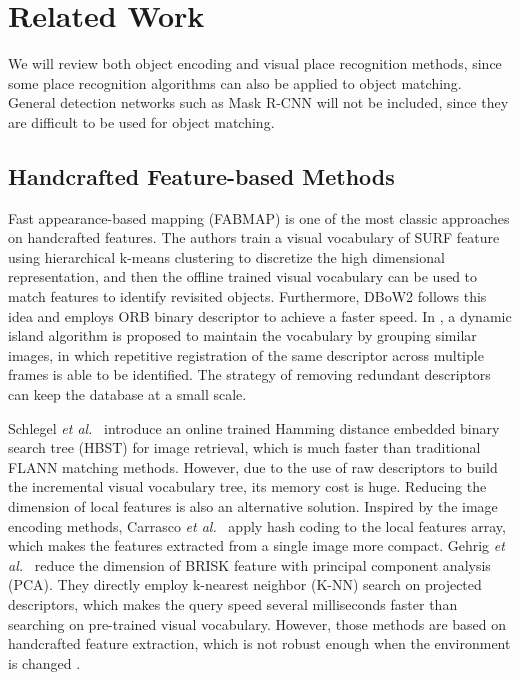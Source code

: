 \documentclass[letterpaper, 10 pt, journal, twoside]{IEEEtran}  %
\newcommand{\etal}{\textit{et al.}~}
\begin{document}
\section{Related Work}

We will review both object encoding and visual place recognition methods, since some place recognition algorithms can also be applied to object matching.
General detection networks such as Mask R-CNN \cite{he2017mask} will not be included, since they are difficult to be used for object matching.

\subsection{Handcrafted Feature-based Methods}

Fast appearance-based mapping (FABMAP) \cite{glover2012openfabmap} is one of the most classic approaches on handcrafted features. The authors train a visual vocabulary of SURF feature \cite{bay2006surf} using hierarchical k-means clustering to discretize the high dimensional representation, and then the offline trained visual vocabulary can be used to match features to identify revisited objects. Furthermore, DBoW2 \cite{galvez2012bags} follows this idea and employs ORB binary descriptor \cite{rublee2011orb} to achieve a faster speed.  In \cite{garcia2018ibow}, a dynamic island algorithm is proposed to maintain the vocabulary by grouping similar images, in which repetitive registration of the same descriptor across multiple frames is able to be identified. The strategy of removing redundant descriptors can keep the database at a small scale.

Schlegel \etal \cite{schlegel2018hbst} introduce an online trained Hamming distance embedded binary search tree (HBST) for image retrieval, which is much faster than traditional FLANN matching methods. However, due to the use of raw descriptors to build the incremental visual vocabulary tree, its memory cost is huge. Reducing the dimension of local features is also an alternative solution. Inspired by the image encoding methods, Carrasco \etal  \cite{carrasco2016global} apply hash coding to the local features array, which makes the features extracted from a single image more compact. Gehrig \etal  \cite{gehrig2017visual} reduce the dimension of BRISK \cite{leutenegger2011brisk} feature with principal component analysis (PCA). They directly employ k-nearest neighbor (K-NN) search on projected descriptors, which makes the query speed several milliseconds faster than searching on pre-trained visual vocabulary. However, those methods are based on handcrafted feature extraction, which is not robust enough when the environment is changed \cite{sarlin2020superglue}.
\end{document}
